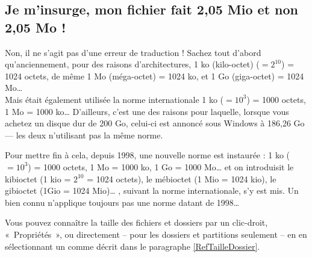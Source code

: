 \subsection{Je m'insurge, mon fichier fait  2,05 Mio et non 2,05 Mo !}
\label{RefMoMio}
Non, il ne s'agit pas d'une erreur de traduction ! Sachez tout d'abord qu'anciennement, pour des raisons d'architectures, 1 ko (kilo-octet) ($= 2^{10}$) = 1024 octets, de même 1 Mo (méga-octet) = 1024 ko, et 1 Go (giga-octet) = 1024 Mo\ldots{}\\
Mais était également utilisée la norme internationale 1 ko ($= 10^3$) = 1000 octets, 1 Mo = 1000 ko\ldots{} D'ailleurs, c'est une des raisons pour laquelle, lorsque vous achetez un disque dur de 200 Go, celui-ci est annoncé sous Windows à 186,26 Go --- les deux n'utilisant pas la même norme.\par
Pour mettre fin à cela, depuis 1998, une nouvelle norme est instaurée : 1 ko ($= 10^3$) = 1000 octets, 1 Mo = 1000 ko, 1 Go = 1000 Mo\ldots{} et on introduisit le kibioctet (1 kio = $2^{10}$ = 1024 octets), le mébioctet (1 Mio = 1024 kio), le gibioctet (1Gio = 1024 Mio)\ldots{} , suivant la norme internationale, s'y est mis. Un   bien connu n'applique toujours pas une norme datant de 1998\ldots{}\par
\begin{nota}
Vous pouvez connaître la taille des fichiers et dossiers par un clic-droit, «~Propriétés~», ou directement -- pour les dossiers et partitions seulement -- en en sélectionnant un comme décrit dans le paragraphe \ref{RefTailleDossier}.
\end{nota}
